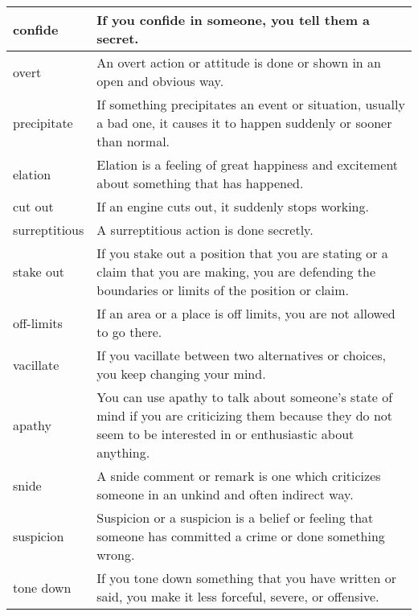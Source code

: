 \documentclass{article}
\begin{document}
\begin{center}
\begin{longtable}{|l|p{9cm}|}
\hline
confide
&
If you confide in someone, you tell them a secret.
\\

\hline
overt
&
An overt action or attitude is done or shown in an open and obvious way.
\\

\hline
precipitate
&
If something precipitates an event or situation, usually a bad one, it causes it to happen suddenly or sooner than normal.
\\

\hline
elation
&
Elation is a feeling of great happiness and excitement about something that has happened.
\\

\hline
cut out
&
If an engine cuts out, it suddenly stops working.
\\

\hline
surreptitious
&
A surreptitious action is done secretly.
\\

\hline
stake out
&
If you stake out a position that you are stating or a claim that you are making, you are defending the boundaries or limits of the position or claim.
\\

\hline
off-limits
&
If an area or a place is off limits, you are not allowed to go there.
\\

\hline
vacillate
&
If you vacillate between two alternatives or choices, you keep changing your mind.
\\

\hline
apathy
&
You can use apathy to talk about someone's state of mind if you are criticizing them because they do not seem to be interested in or enthusiastic about anything.
\\

\hline
snide
&
A snide comment or remark is one which criticizes someone in an unkind and often indirect way.
\\

\hline
suspicion
&
Suspicion or a suspicion is a belief or feeling that someone has committed a crime or done something wrong.
\\

\hline
tone down
&
If you tone down something that you have written or said, you make it less forceful, severe, or offensive.
\\

\hline

\end{longtable}
\end{center}
\end{document}
